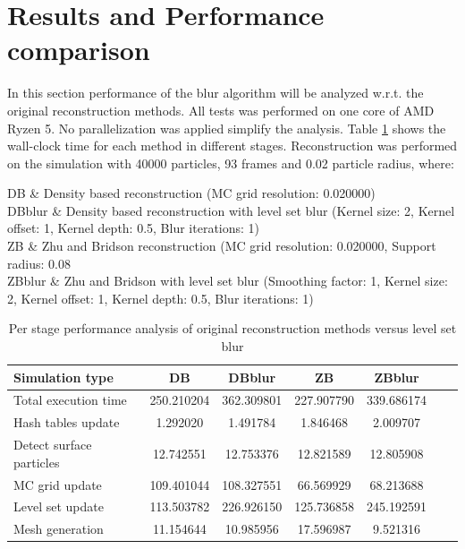 \section{Results and Performance comparison}
In this section performance of the blur algorithm will be analyzed w.r.t. the original reconstruction methods. All tests was performed on one core of AMD Ryzen 5. No parallelization was applied simplify the analysis.
Table \ref{tab:perf_analysis} shows the wall-clock time for each method in different stages.
Reconstruction was performed on the simulation with 40000 particles, 93 frames and 0.02 particle radius, where:
\begin{conditions}
	DB & Density based reconstruction (MC grid resolution: 0.020000)\\
	DBblur & Density based reconstruction with level set blur (Kernel size: 2, Kernel offset: 1, Kernel depth: 0.5, Blur iterations: 1)\\
	ZB & Zhu and Bridson reconstruction (MC grid resolution: 0.020000, Support radius: 0.08\\
	ZBblur & Zhu and Bridson with level set blur (Smoothing factor: 1, Kernel size: 2, Kernel offset: 1, Kernel depth: 0.5, Blur iterations: 1)\\
\end{conditions}
\begin{table}[h]
	\begin{center}
		\scriptsize
		\begin{tabular}{|l|c|c|c|c|c|c|}
			\hline
			Simulation type & DB & DBblur & ZB & ZBblur \\
			\hline
			Total execution time		&	250.210204	&	362.309801	&	227.907790	&	339.686174	\\
			Hash tables update			&	1.292020	&	1.491784	&	1.846468	&	2.009707	\\
			Detect surface particles	&	12.742551	&	12.753376	&	12.821589	&	12.805908	\\
			MC grid update				&	109.401044	&	108.327551	&	66.569929	&	68.213688	\\
			Level set update			&	113.503782	&	226.926150	&	125.736858	&	245.192591	\\
			Mesh generation				&	11.154644	&	10.985956	&	17.596987	&	9.521316	\\
			\hline
		\end{tabular}
	\end{center}
	\caption{Per stage performance analysis of original reconstruction methods versus level set blur}
	\label{tab:perf_analysis}
\end{table}

